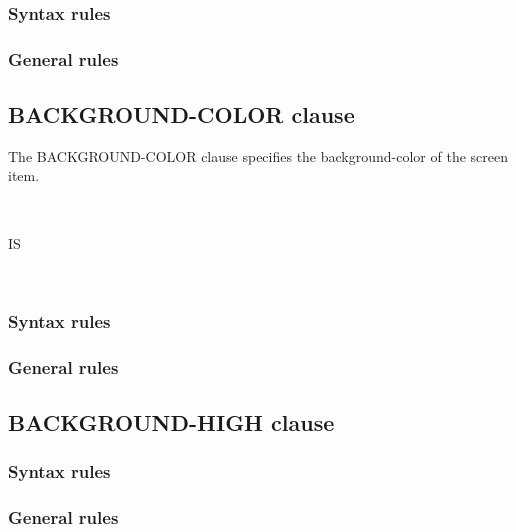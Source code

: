 \subsubsection{Syntax rules}

\subsubsection{General rules}

\subsection{BACKGROUND-COLOR clause}

The BACKGROUND-COLOR clause specifies the background-color of the screen item.

\begin{syntax}
  \begin{1=}
     \\
  \end{1=}
  IS
  \begin{1=}
    \identifier \\
    \literal
  \end{1=}
\end{syntax}

\subsubsection{Syntax rules}

\subsubsection{General rules}

\subsection{BACKGROUND-HIGH clause}

\begin{syntax}[\miscextcolour]
\end{syntax}

\subsubsection{Syntax rules}

\subsubsection{General rules}

